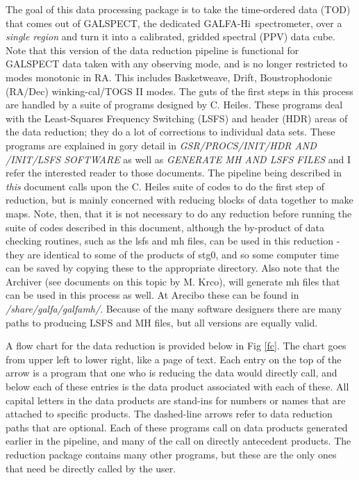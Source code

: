 \documentclass[11pt]{article}
\newcommand{\hi}{H{\sc i}~}
\begin{document}
The goal of this data processing package is to take the time-ordered data (TOD) that comes out of GALSPECT, the dedicated GALFA-\hi spectrometer, over a {\it single region} and turn it into a calibrated, gridded spectral (PPV) data cube. Note that this version of the data reduction pipeline is functional for GALSPECT data taken with any observing mode, and is no longer restricted to modes monotonic in RA. This includes Basketweave, Drift, Boustrophodonic (RA/Dec) winking-cal/TOGS II modes. The guts of the first steps in this process are handled by a suite of programs designed by C. Heiles. These programs deal with the Least-Squares Frequency Switching (LSFS) and header (HDR) areas of the data reduction; they do a lot of corrections to individual data sets. These programs are explained in gory detail in {\it GSR/PROCS/INIT/HDR AND /INIT/LSFS SOFTWARE} as well as {\it GENERATE MH AND LSFS FILES} and I refer the interested reader to those documents. The pipeline being described in \emph{this} document calls upon the C. Heiles suite of codes to do the first step of reduction, but is mainly concerned with reducing blocks of data together to make maps. Note, then, that it is not necessary to do any reduction before running the suite of codes described in this document, although the by-product of data checking routines, such as the lsfs and mh files, can be used in this reduction - they are identical to some of the products of stg0, and so some computer time can be saved by copying these to the appropriate directory. Also note that the Archiver (see documents on this topic by M. Krco), will generate mh files that can be used in this process as well. At Arecibo these can be found in {\it /share/galfa/galfamh/}. Because of the many software designers there are many paths to producing LSFS and MH files, but all versions are equally valid.

A flow chart for the data reduction is provided below in Fig \ref{fc}. The chart goes from upper left to lower right, like a page of text. Each entry on the top of the arrow is a program that one who is reducing the data would directly call, and below each of these entries is the data product associated with each of these. All capital letters in the data products are stand-ins for numbers or names that are attached to specific products. The dashed-line arrows refer to data reduction paths that are optional. Each of these programs call on data products generated earlier in the pipeline, and many of the call on directly antecedent products. The reduction package contains many other programs, but these are the only ones that need be directly called by the user.
\end{document}

